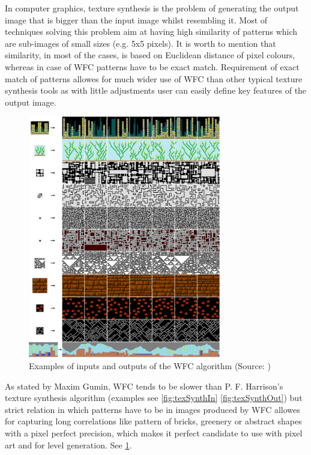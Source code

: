 \documentclass[shortabstract, english, inz]{iithesis}
\begin{document}
In computer graphics, texture synthesis is the problem of generating the output image that is bigger than the input image whilst resembling it. Most of techniques solving this problem aim at having high similarity of patterns which are sub-images of small sizes (e.g. 5x5 pixels). It is worth to mention that similarity, in most of the cases, is based on Euclidean distance of pixel colours, whereas in case of WFC patterns have to be exact match.\cite{Smith}
Requirement of exact match of patterns allowes for much wider use of WFC than other typical texture synthesis tools as with little adjustments user can easily define key features of the output image. \cite{GraphBased}
\begin{figure}[H]
\centering
\includegraphics[width=0.75\textwidth, angle=0]{images/wfc.png}
\caption{Examples of inputs and outputs of the WFC algorithm (Source: \cite{MaximGumin})}
\label{fig:wfc}
\end{figure}
As stated by Maxim Gumin, WFC tends to be slower than P. F. Harrison's texture synthesis  algorithm (examples see \ref{fig:texSynthIn} \ref{fig:texSynthOut}) but strict relation in which patterns have to be in images produced by WFC allowes for capturing long correlations like pattern of bricks, greenery or abstract shapes with a pixel perfect precision, which makes it perfect candidate to use with pixel art and for level generation. See \ref{fig:wfc}.\cite{MaximGumin}
\end{document}
